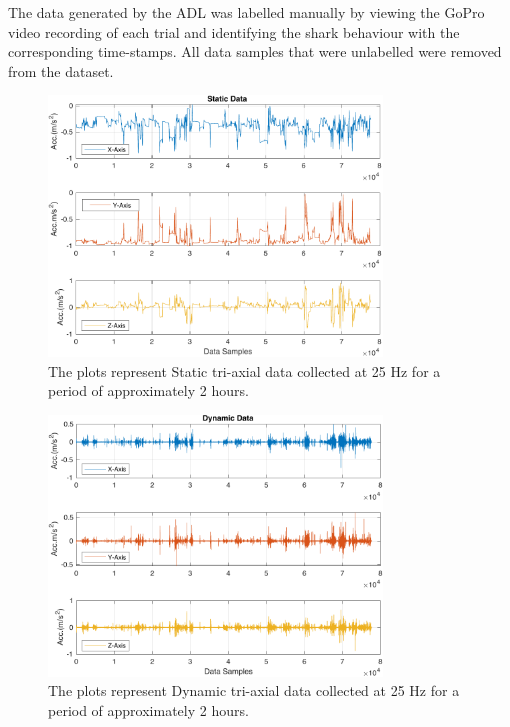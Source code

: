 \documentclass[conference]{IEEEtran}
\begin{document}
The data generated by the ADL was labelled manually by viewing the GoPro video recording of each trial and identifying the shark behaviour with the corresponding time-stamps. All data samples that were unlabelled were removed from the dataset. 
\begin{figure}[h]
	\centering
	\includegraphics[width=3.49in]{1_static.pdf}
	\caption{The plots represent Static tri-axial data collected at 25 Hz for a period of approximately 2 hours.}
	\label{static}
\end{figure}
\begin{figure}[h]
	\centering
	\includegraphics[width=3.49in]{2_dynamic.pdf}
	\caption{The plots represent Dynamic tri-axial data collected at 25 Hz for a period of approximately 2 hours.}
	\label{dynamic}
\end{figure}
\end{document}
